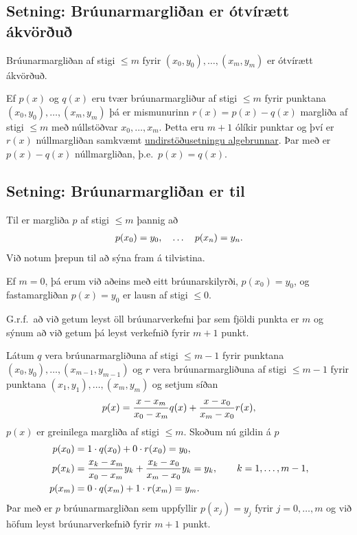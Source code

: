 \documentclass[A4paper,10pt,icelandic]{sphinxmanual}
\begin{document}
\subsection{Setning: Brúunarmargliðan er ótvírætt ákvörðuð}
\label{kafli03:setning-bruunarmarglian-er-otviraett-akvoru}
Brúunarmargliðan af stigi \(\leq m\) fyrir \((x_0,y_0),\ldots,(x_m,y_m)\) er
ótvírætt ákvörðuð.

Ef \(p(x)\) og \(q(x)\) eru tvær
brúunarmargliður af stigi \(\leq m\) fyrir punktana
\((x_0,y_0), \ldots, (x_m,y_m)\) þá er mismunurinn
\(r(x) = p(x) - q(x)\) margliða af stigi \(\leq m\) með
núllstöðvar \(x_0, \ldots, x_m\). Þetta eru \(m+1\) ólíkir
punktar og því er \(r(x)\) núllmargliðan samkvæmt
\href{http://www.stae.is/fletta/undirst\%C3\%B6\%C3\%B0usetning/algebrunnar}{undirstöðusetningu algebrunnar}.
Þar með er \(p(x) - q(x)\) núllmargliðan, þ.e. \(p(x) = q(x)\).


\subsection{Setning: Brúunarmargliðan er til}
\label{kafli03:setning-bruunarmarglian-er-til}
Til er margliða \(p\) af stigi \(\leq m\) þannig að
\begin{gather}
\begin{split}p(x_0) = y_0, \quad \ldots \quad p(x_n)=y_n.\end{split}\notag
\end{gather}
Við notum þrepun til að sýna fram á tilvistina.

Ef \(m = 0\), þá erum við aðeins með eitt brúunarskilyrði,
\(p(x_0) = y_0\), og fastamargliðan \(p(x) = y_0\) er lausn af
stigi \(\leq 0\).

G.r.f. að við getum leyst öll brúunarverkefni þar sem fjöldi punkta er
\(m\) og sýnum að við getum þá leyst verkefnið fyrir \(m+1\)
punkt.

Látum \(q\) vera brúunarmargliðuna af stigi \(\leq m-1\) fyrir
punktana \((x_0,y_0), \ldots,
(x_{m-1},y_{m-1})\) og \(r\) vera brúunarmargliðuna af stigi
\(\leq m-1\) fyrir punktana \((x_1,y_1), \ldots, (x_m,y_m)\) og
setjum síðan
\begin{gather}
\begin{split}p(x) = \frac{x-x_m}{x_0-x_m}q(x) + \frac{x-x_0}{x_m-x_0}r(x),\end{split}\notag
\end{gather}
\(p(x)\) er greinilega margliða af stigi \(\leq m\). Skoðum nú
gildin á \(p\)
\begin{gather}
\begin{split}\begin{aligned}
  p(x_0) &= 1 \cdot q(x_0) + 0\cdot r(x_0) = y_0, \\
  p(x_k) &= \frac{x_k-x_m}{x_0-x_m}y_k
  + \frac{x_k-x_0}{x_m-x_0}y_k = y_k,\qquad k = 1, \ldots, m-1,\\
  p(x_m) &= 0 \cdot q(x_m) + 1 \cdot r(x_m) = y_m.\end{aligned}\end{split}\notag
\end{gather}
Þar með er \(p\) brúunarmargliðan sem uppfyllir \(p(x_j)=y_j\)
fyrir \(j=0,\dots,m\) og við höfum leyst brúunarverkefnið fyrir
\(m+1\) punkt.
\end{document}

